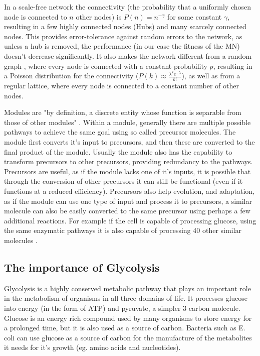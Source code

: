 \documentclass[a4paper,12pt]{article}
\begin{document}
	In a scale-free network the connectivity (the probability that a uniformly chosen node is connected to $n$ other nodes) is $P(n)=n^{-\gamma}$ for some constant $\gamma$, resulting in a few highly connected nodes (Hubs) and many scarcely connected nodes. This provides error-tolerance against random errors to the network, as unless a hub is removed, the performance (in our case the fitness of the MN) doesn't decrease significantly. It also makes the network different from a random graph \cite{randomgraphs}, where every node is connected with a constant probability $p$, resulting in a Poisson distribution for the connectivity ($P(k) \approx \frac{\lambda^k e^{-\lambda}}{k!} $), as well as from a regular lattice, where every node is connected to a constant number of other nodes.
	  
	Modules are "by definition, a discrete entity whose function is separable from those of other modules" \cite{modulardef}. Within a module, generally there are multiple possible pathways to achieve the same goal using so called precursor molecules. The module first converts it's input to precursors, and then these are converted to the final product of the module. Usually the module also has the capability to transform precursors to other precursors, providing redundancy to the pathways. Precursors are useful, as if the module lacks one of it's inputs, it is possible that through the conversion of other precursors it can still be functional (even if it functions at a reduced efficiency). Precursors also help evolution, and adaptation, as if the module can use one type of input and process it to precursors, a similar molecule can also be easily converted to the same precursor using perhaps a few additional reactions. For example if the cell is capable of processing glucose, using the same enzymatic pathways it is also capable of processing 40 other similar molecules \cite{latent}.
	
\subsection{The importance of Glycolysis}
\label{sub:importance_of_glycolysis}

Glycolysis is a highly conserved metabolic pathway that plays an important role in the metabolism of organisms in all three domains of life. It processes glucose into energy (in the form of ATP) and pyruvate, a simpler 3 carbon molecule. Glucose is an energy rich compound used by many organisms to store energy for a prolonged time, but it is also used as a source of carbon. Bacteria such as E. coli can use glucose as a source of carbon for the manufacture of the metabolites it needs for it's growth (eg. amino acids and nucleotides). \cite[]{principlesofbio} 
\end{document}
